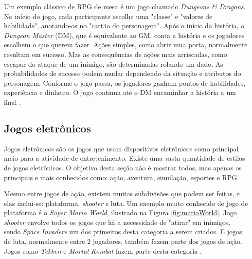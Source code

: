 \documentclass[
	12pt,					%
	openright,				%
	oneside,				%
	a4paper,				%
	bibjustif,				%
	chapter=TITLE,			%
	english,				%
	brazil,					%
	]{abntex2}
\begin{document}
		Um exemplo clássico de RPG de mesa é um jogo chamado \textit{Dungeons \& Dragons}.
		No início do jogo,
		cada participante escolhe uma "classe"{} e "valores de habilidade",
		anotando-os no "cartão do personagem"{}.
		Após o início da história,
		o \textit{Dungeon Master} (DM), que é equivalente ao GM, conta a história
		e os jogadores escolhem o que querem fazer.
		Ações simples, como abrir uma porta, normalmente resultam em sucesso.
		Mas as consequências de ações mais arriscadas,
		como escapar do ataque de um inimigo,
		são determinadas rolando um dado.
		As probabilidades de sucesso podem mudar dependendo da situação e atributos do personagem.
		Conforme o jogo passa,
		os jogadores ganham pontos de habilidades, experiência e dinheiro.
		O jogo continua até o DM encaminhar a história a um final \cite{dungeonsDragons}.
			
	
		\FloatBarrier
		\subsection{Jogos eletrônicos}
		Jogos eletrônicos são os jogos que usam dispositivos eletrônicos como principal meio para a atividade de entretenimento.
		Existe uma vasta quantidade de estilos de jogos eletrônicos.
		O objetivo desta seção não é mostrar todos,
		mas apenas os principais e mais conhecidos como:
		ação, aventura, simulação, esportes e RPG.
		
		Mesmo entre jogos de ação,
		existem muitas subdivisões que podem ser feitas,
		e elas inclui-se: plataforma, \textit{shooter} e luta.
		Um exemplo muito conhecido de jogo de plataforma é o \textit{Super Mario World},
		ilustrado na Figura \ref{fig:marioWorld}.
		Jogo \textit{shooter} envolve todos os jogos que há a necessidade de "atirar"{} em inimigos,
		sendo \textit{Space Invaders} um dos primeiros desta categoria a serem criados.
		E jogos de luta, normalmente entre 2 jogadores,
		também fazem parte dos jogos de ação.
		Jogos como \textit{Tekken} e \textit{Mortal Kombat} fazem parte desta categoria \cite{gameGenres}.
		
\end{document}
